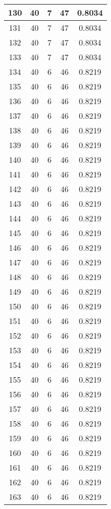 \documentclass[letterpaper, 12pt]{article}
\begin{document}
\begin{longtable}{|c|c|c|c|c|}
\hline
130 & 40 & 7 & 47 & 0.8034 \\
\hline
131 & 40 & 7 & 47 & 0.8034 \\
\hline
132 & 40 & 7 & 47 & 0.8034 \\
\hline
133 & 40 & 7 & 47 & 0.8034 \\
\hline
134 & 40 & 6 & 46 & 0.8219 \\
\hline
135 & 40 & 6 & 46 & 0.8219 \\
\hline
136 & 40 & 6 & 46 & 0.8219 \\
\hline
137 & 40 & 6 & 46 & 0.8219 \\
\hline
138 & 40 & 6 & 46 & 0.8219 \\
\hline
139 & 40 & 6 & 46 & 0.8219 \\
\hline
140 & 40 & 6 & 46 & 0.8219 \\
\hline
141 & 40 & 6 & 46 & 0.8219 \\
\hline
142 & 40 & 6 & 46 & 0.8219 \\
\hline
143 & 40 & 6 & 46 & 0.8219 \\
\hline
144 & 40 & 6 & 46 & 0.8219 \\
\hline
145 & 40 & 6 & 46 & 0.8219 \\
\hline
146 & 40 & 6 & 46 & 0.8219 \\
\hline
147 & 40 & 6 & 46 & 0.8219 \\
\hline
148 & 40 & 6 & 46 & 0.8219 \\
\hline
149 & 40 & 6 & 46 & 0.8219 \\
\hline
150 & 40 & 6 & 46 & 0.8219 \\
\hline
151 & 40 & 6 & 46 & 0.8219 \\
\hline
152 & 40 & 6 & 46 & 0.8219 \\
\hline
153 & 40 & 6 & 46 & 0.8219 \\
\hline
154 & 40 & 6 & 46 & 0.8219 \\
\hline
155 & 40 & 6 & 46 & 0.8219 \\
\hline
156 & 40 & 6 & 46 & 0.8219 \\
\hline
157 & 40 & 6 & 46 & 0.8219 \\
\hline
158 & 40 & 6 & 46 & 0.8219 \\
\hline
159 & 40 & 6 & 46 & 0.8219 \\
\hline
160 & 40 & 6 & 46 & 0.8219 \\
\hline
161 & 40 & 6 & 46 & 0.8219 \\
\hline
162 & 40 & 6 & 46 & 0.8219 \\
\hline
163 & 40 & 6 & 46 & 0.8219 \\

\end{longtable}
\end{document}
